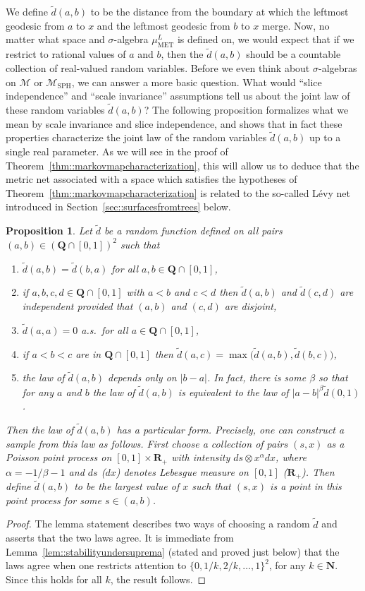 \documentclass[10pt]{amsart}
\let\mathcal\mathscr
\theoremstyle{plain}
\numberwithin{theorem}{section}
\newtheorem{proposition}[theorem]{Proposition}
\theoremstyle{definition}
\newcommand\gmsspace{{\mathcal M}_{\mathrm{SPH}}}
\newcommand\mmspace{{\mathcal M}}
\newcommand{\R}{\mathbf{R}}
\newcommand{\N}{\mathbf{N}}
\newcommand{\Q}{{\mathbf Q}}
\newcommand{\muml}{\mu_{\mathrm{MET}}^L}
\let\wt\widetilde
\begin{document}
We define $\wt{d}(a,b)$ to be the distance from the boundary at which the leftmost geodesic from $a$ to $x$ and the leftmost geodesic from $b$ to $x$ merge. Now, no matter what space and $\sigma$-algebra $\muml$ is defined on, we would expect that if we restrict to rational values of $a$ and $b$, then the $\wt{d}(a,b)$ should be a countable collection of real-valued random variables. Before we even think about $\sigma$-algebras on $\mmspace$ or $\gmsspace$, we can answer a more basic question. What would ``slice independence'' and ``scale invariance'' assumptions tell us about the joint law of these random variables $\wt{d}(a,b)$? The following proposition formalizes what we mean by scale invariance and slice independence, and shows that in fact these properties characterize the joint law of the random variables $\wt{d}(a,b)$ up to a single real parameter. As we will see in the proof of Theorem~\ref{thm::markovmapcharacterization}, this will allow us to deduce that the metric net associated with a space which satisfies the hypotheses of Theorem~\ref{thm::markovmapcharacterization} is related to the so-called Lévy net introduced in Section~\ref{sec::surfacesfromtrees} below.

\begin{proposition}
\label{prop::poissonslicestructure}
Let $\wt{d}$ be a random function defined on all pairs \hbox{$(a,b)\!\in\!(\Q \cap [0,1])^2$} such that
\begin{enumerate}
\item $\wt{d}(a,b) = \wt{d}(b,a)$ for all $a,b \in \Q \cap [0,1]$,
\item if $a,b,c,d \in \Q \cap [0,1]$ with $a<b$ and $c<d$ then $\wt{d}(a,b)$ and $\wt{d}(c,d)$ are independent provided that $(a,b)$ and $(c,d)$ are disjoint,
\item $\wt{d}(a,a) = 0$ a.s.\ for all $a \in \Q \cap [0,1]$,
\item if $a<b<c$ are in $\Q \cap [0,1]$ then $\wt{d}(a,c) = \max\bigl( \wt{d}(a,b), \wt{d}(b,c) \bigr)$,
\item the law of $\wt{d}(a,b)$ depends only on $|b-a|$. In fact, there is some $\beta$ so that for any $a$ and $b$ the law of $\wt{d}(a,b)$ is equivalent to the law of $|a-b|^{\beta} \wt{d}(0,1)$.
\end{enumerate}
Then the law of $\wt{d}(a,b)$ has a particular form. Precisely, one can construct a sample from this law as follows. First choose a collection of pairs $(s,x)$ as a Poisson point process on $[0,1] \times \R_+$ with intensity $ds \otimes x^{\alpha}dx$, where $\alpha = -1/\beta - 1$ and $ds$ (\resp $dx$) denotes Lebesgue measure on $[0,1]$ (\resp $\R_+$). Then define $\wt{d}(a,b)$ to be the largest value of $x$ such that $(s,x)$ is a point in this point process for some $s \in (a,b)$.
\end{proposition}
\begin{proof}
The lemma statement describes two ways of choosing a random $\wt{d}$ and asserts that the two laws agree. It is immediate from Lemma~\ref{lem::stabilityundersuprema} (stated and proved just below) that the laws agree when one restricts attention to $\{0,1/k,2/k,\ldots, 1\}^2$, for any $k \in \N$. Since this holds for all $k$, the result follows.
\end{proof}
\end{document}
